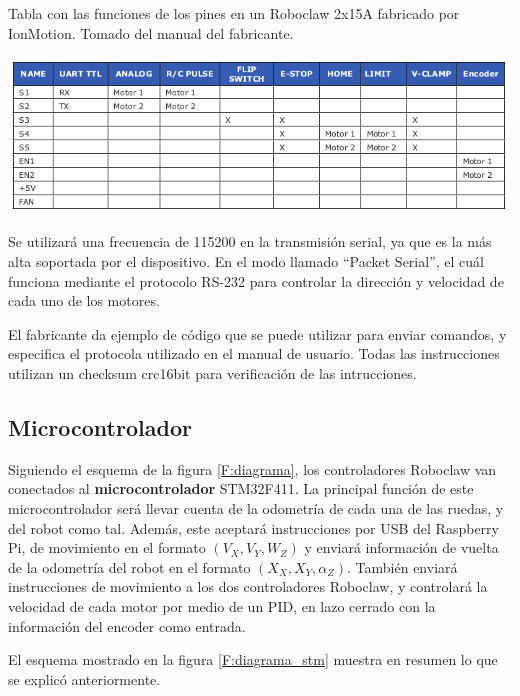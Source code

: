 \begin{table}[H]
\centering
\caption{Tabla con las funciones de los pines en un Roboclaw 2x15A fabricado por IonMotion. Tomado del manual del fabricante.}
\includegraphics[scale=0.7]{imagenes/pines.png}
\label{T:pines}
\end{table}

Se utilizará una frecuencia de 115200 en la transmisión serial, ya que es la más alta soportada por el dispositivo. En el modo llamado ``Packet Serial'', el cuál funciona mediante el protocolo RS-232 para controlar la dirección y velocidad de cada uno de los motores.

El fabricante da ejemplo de código que se puede utilizar para enviar comandos, y especifica el protocola utilizado en el manual de usuario. Todas las instrucciones utilizan un checksum crc16bit para verificación de las intrucciones.

\subsection{Microcontrolador}

Siguiendo el esquema de la figura \ref{F:diagrama}, los controladores Roboclaw van conectados al \textbf{microcontrolador} STM32F411. La principal función de este microcontrolador será llevar cuenta de la odometría de cada una de las ruedas, y del robot como tal. Además, este aceptará instrucciones por USB del Raspberry Pi, de movimiento en el formato $(V_X, V_Y, W_Z)$ y enviará información de vuelta de la odometría del robot en el formato $(X_X, X_Y, \alpha_Z)$. También enviará instrucciones de movimiento a los dos controladores Roboclaw, y controlará la velocidad de cada motor por medio de un PID, en lazo cerrado con la información del encoder como entrada.

El esquema mostrado en la figura \ref{F:diagrama_stm} muestra en resumen lo que se explicó anteriormente.

